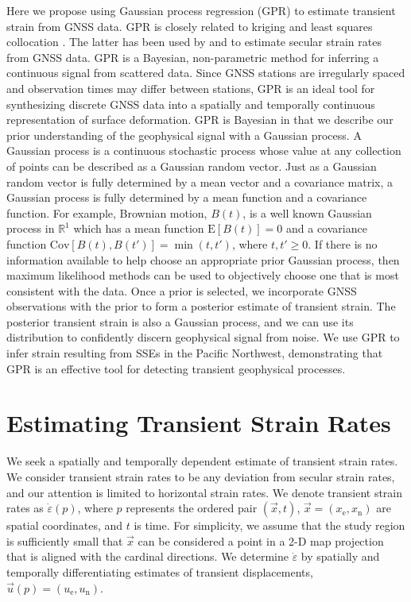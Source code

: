 \documentclass[extra,mreferee]{gji}
\begin{document}
Here we propose using Gaussian process regression (GPR) \citep{Rasmussen2006} to estimate transient strain from GNSS data. GPR is closely related to kriging \citep{Cressie1992} and least squares collocation \citep{Moritz1978}. The latter has been used by \citet{Kato1998} and \citet{El-Fiky1999} to estimate secular strain rates from GNSS data. GPR is a Bayesian, non-parametric method for inferring a continuous signal from scattered data. Since GNSS stations are irregularly spaced and observation times may differ between stations, GPR is an ideal tool for synthesizing discrete GNSS data into a spatially and temporally continuous representation of surface deformation. GPR is Bayesian in that we describe our prior understanding of the geophysical signal with a Gaussian process. A Gaussian process is a continuous stochastic process whose value at any collection of points can be described as a Gaussian random vector. Just as a Gaussian random vector is fully determined by a mean vector and a covariance matrix, a Gaussian process is fully determined by a mean function and a covariance function. For example, Brownian motion, $B(t)$, is a well known Gaussian process in $\mathbb{R}^1$ which has a mean function $\mathrm{E}[B(t)] = 0$ and a covariance function $\mathrm{Cov}\left[B(t),B(t')\right] = \min(t,t')$, where $t,t' \ge 0$. If there is no information available to help choose an appropriate prior Gaussian process, then maximum likelihood methods can be used to objectively choose one that is most consistent with the data. Once a prior is selected, we incorporate GNSS observations with the prior to form a posterior estimate of transient strain. The posterior transient strain is also a Gaussian process, and we can use its distribution to confidently discern geophysical signal from noise. We use GPR to infer strain resulting from SSEs in the Pacific Northwest, demonstrating that GPR is an effective tool for detecting transient geophysical processes. 

\section{Estimating Transient Strain Rates}\label{sec:Method}
We seek a spatially and temporally dependent estimate of transient strain rates. We consider transient strain rates to be any deviation from secular strain rates, and our attention is limited to horizontal strain rates. We denote transient strain rates as $\dot\varepsilon(p)$, where $p$ represents the ordered pair $(\vec{x},t)$, $\vec{x} = (x_\mathrm{e},x_\mathrm{n})$ are spatial coordinates, and $t$ is time. For simplicity, we assume that the study region is sufficiently small that $\vec{x}$ can be considered a point in a 2-D map projection that is aligned with the cardinal directions. We determine $\dot\varepsilon$ by spatially and temporally differentiating estimates of transient displacements, $\vec{u}(p) = (u_\mathrm{e},u_\mathrm{n})$. 
\end{document}
